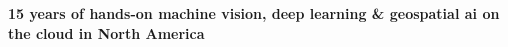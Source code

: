 \onehalfspace
\textbf{\large 15 years of hands-on machine vision, deep learning \& geospatial ai  on the cloud in North America}
\singlespace

\vspace{0.8cm}

